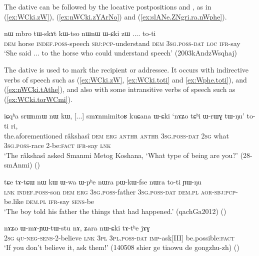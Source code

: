 The dative can be followed by the locative postpositions  and , as in (\ref{ex:WCki.zW}), (\ref{ex:nWCki.zYArNo}) and (\ref{ex:slANe.ZNgri.ra.nWphe}).


\begin{exe}
\ex \label{ex:WCki.zW}
\gll nɯ mbro tɯ-skɤt kɯ-tso nɯnɯ ɯ-ɕki zɯ .... to-ti \\
\textsc{dem} horse \textsc{indef}.\textsc{poss}-speech \textsc{sbj}:\textsc{pcp}-understand \textsc{dem} \textsc{3sg}.\textsc{poss}-\textsc{dat} \textsc{loc} { } \textsc{ifr}-say \\
\glt `She said ... to the horse who could understand speech' (2003kAndzWsqhaj)
\end{exe}

The dative is used to mark the recipient or addressee. It occurs with indirective verbs of speech such as  (\ref{ex:WCki.zW}, \ref{ex:WCki.toti} and \ref{ex:Wphe.toti}),  and  (\ref{ex:nWCki.tAthe}), and also with some intransitive verbs of speech such as  (\ref{ex:WCki.torWCmi}).

\begin{exe}
\ex \label{ex:WCki.toti}
\gll iɕqʰa srɯnmɯ nɯ kɯ, [...] smɤnmimitoʁ kuɕana ɯ-ɕki `nɤʑo tɕʰi ɯ-rɯɣ tɯ-ŋu' to-ti ri, \\
the.aforementioned râkshasî \textsc{dem} \textsc{erg} { }  \textsc{anthr} \textsc{anthr} \textsc{3sg}.\textsc{poss}-\textsc{dat} \textsc{2sg} what \textsc{3sg}.\textsc{poss}-race 2-be:\textsc{fact} \textsc{ifr}-say \textsc{lnk} \\
\glt `The râkshasî asked Smanmi Metog Koshana, `What type of being are you?' (28-smAnmi)
()
\end{exe}

\begin{exe}
\ex \label{ex:Wphe.toti}
\gll tɕe tɤ-tɕɯ nɯ kɯ ɯ-wa ɯ-pʰe nɯra pɯ-kɯ-fse nɯra to-ti ɲɯ-ŋu \\
\textsc{lnk} \textsc{indef}.\textsc{poss}-son \textsc{dem} \textsc{erg} \textsc{3sg}.\textsc{poss}-father \textsc{3sg}.\textsc{poss}-\textsc{dat} \textsc{dem}.\textsc{pl} \textsc{aor}-\textsc{sbj}:\textsc{pcp}-be.like \textsc{dem}.\textsc{pl}  \textsc{ifr}-say \textsc{sens}-be \\
\glt `The boy told his father the things that had happened.' (qachGa2012)
()
\end{exe}

\begin{exe}
\ex \label{ex:nWCki.tAthe}
\gll nɤʑo ɯ-mɤ-ɲɯ-tɯ-stu nɤ, ʑara nɯ-ɕki tɤ-tʰe jɤɣ \\
\textsc{2sg} \textsc{qu}-\textsc{neg}-\textsc{sens}-2-believe \textsc{lnk} \textsc{3pl} \textsc{3pl}.\textsc{poss}-\textsc{dat} \textsc{imp}-ask[III] be.possible:\textsc{fact} \\
\glt `If you don't believe it, ask them!' (140508 shier ge tiaowu de gongzhu-zh)
()
\end{exe}

